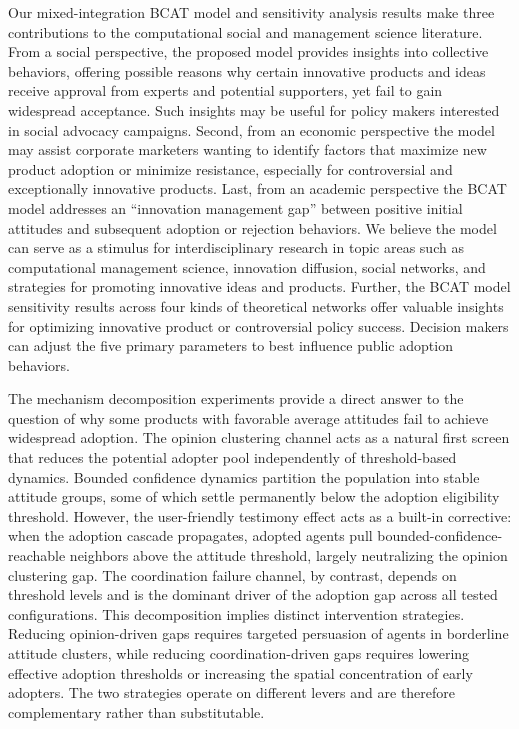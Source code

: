 \documentclass[10pt,letterpaper]{article}
\begin{document}
Our mixed-integration BCAT model and sensitivity analysis results make three contributions to the computational social and management science literature. From a social perspective, the proposed model provides insights into collective behaviors, offering possible reasons why certain innovative products and ideas receive approval from experts and potential supporters, yet fail to gain widespread acceptance. Such insights may be useful for policy makers interested in social advocacy campaigns. Second, from an economic perspective the model may assist corporate marketers wanting to identify factors that maximize new product adoption or minimize resistance, especially for controversial and exceptionally innovative products. Last, from an academic perspective the BCAT model addresses an ``innovation management gap'' between positive initial attitudes and subsequent adoption or rejection behaviors. We believe the model can serve as a stimulus for interdisciplinary research in topic areas such as computational management science, innovation diffusion, social networks, and strategies for promoting innovative ideas and products. Further, the BCAT model sensitivity results across four kinds of theoretical networks offer valuable insights for optimizing innovative product or controversial policy success. Decision makers can adjust the five primary parameters to best influence public adoption behaviors.

The mechanism decomposition experiments provide a direct answer to the question of why some products with favorable average attitudes fail to achieve widespread adoption. The opinion clustering channel acts as a natural first screen that reduces the potential adopter pool independently of threshold-based dynamics. Bounded confidence dynamics partition the population into stable attitude groups, some of which settle permanently below the adoption eligibility threshold. However, the user-friendly testimony effect acts as a built-in corrective: when the adoption cascade propagates, adopted agents pull bounded-confidence-reachable neighbors above the attitude threshold, largely neutralizing the opinion clustering gap. The coordination failure channel, by contrast, depends on threshold levels and is the dominant driver of the adoption gap across all tested configurations. This decomposition implies distinct intervention strategies. Reducing opinion-driven gaps requires targeted persuasion of agents in borderline attitude clusters, while reducing coordination-driven gaps requires lowering effective adoption thresholds or increasing the spatial concentration of early adopters. The two strategies operate on different levers and are therefore complementary rather than substitutable.
\end{document}
